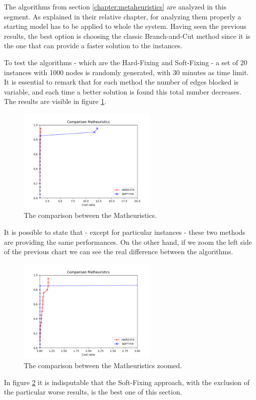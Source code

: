 The algorithms from section \ref{chapter:metaheuristics} are analyzed in this segment. As explained in their relative chapter, for analyzing them properly a starting model has to be applied to whole the system. Having seen the previous results, the best option is choosing the classic Branch-and-Cut method since it is the one that can provide a faster solution to the instances.

To test the algorithms - which are the Hard-Fixing and Soft-Fixing - a set of 20 instances with 1000 nodes is randomly generated, with 30 minutes as time limit. It is essential to remark that for each method the number of edges blocked is variable, and each time a better solution is found this total number decreases. The results are visible in figure \ref{fig:result-math}.

\begin{figure}[h]
	\centering
	\includegraphics[width=0.6\textwidth]{images/final_math.png}
	\caption{The comparison between the Matheuristics.}
	\label{fig:result-math}
\end{figure}

It is possible to state that - except for particular instances - these two methods are providing the same performances. On the other hand, if we zoom the left side of the previous chart we can see the real difference between the algorithms.

\begin{figure}[h]
	\centering
	\includegraphics[width=0.6\textwidth]{images/final_math_zoom.png}
	\caption{The comparison between the Matheuristics zoomed.}
	\label{fig:result-math-zoom}
\end{figure}

In figure \ref{fig:result-math-zoom} it is indisputable that the Soft-Fixing approach, with the exclusion of the particular worse results, is the best one of this section.
